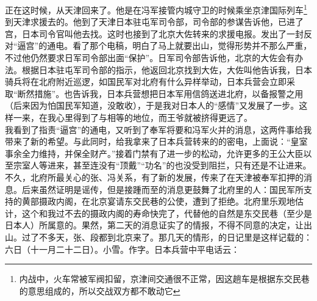 正在这时候，从天津回来了。他是在冯军接管内城守卫的时候乘坐京津国际列车\footnote{内战中，火车常被军阀扣留，京津间交通很不正常，因这趟车是根据东交民巷的意思组成的，所以交战双方都不敢动它}到天津求援去的。他到了天津日本驻屯军司令部，司令部的参谋告诉他，已进了宫，日本司令官叫他去找。这时也接到了北京大佐转来的求援电报。发出了一封反对“逼宫”的通电。看了那个电稿，明白了马上就要出山，觉得形势并不那么严重，不过他仍然要求日军司令部出面“保护”。日军司令部告诉他，北京的大佐会有办法。根据日本驻屯军司令部的指示，他返回北京找到大佐，大佐叫他告诉我，日本骑兵将在北府附近巡逻，如国民军对北府有什么异样举动，日本兵营会立即采取“断然措施”。也告诉我，日本兵营想把日本军用信鸽送进北府，以备报警之用（后来因为怕国民军知道，没敢收），于是我对日本人的“感情”又发展了一步。这样一来，在我心里得到了与相等的地位，而王爷就被挤得更远了。\\

我看到了指责“逼宫”的通电，又听到了奉军将要和冯军火并的消息，这两件事给我带来了新的希望。与此同时，给我拿来了日本兵营转来的的密电，上面说：“皇室事余全力维持，并保全财产。”接着门禁有了进一步的松动，允许更多的王公大臣以至宗室人等进来，甚至连没有“顶戴”“功名”的也没受到阻拦，只有还是不让进来。\\

不久，北府所最关心的张、冯关系，有了新的发展，传来了在天津被奉军扣押的消息。后来虽然证明是谣传，但是接踵而至的消息更鼓舞了北府里的人：国民军所支持的黄部摄政内阁，在北京宴请东交民巷的公使，遭到了拒绝。北府里乐观地估计，这个和我过不去的摄政内阁的寿命快完了，代替他的自然是东交民巷（至少是日本人）所属意的。果然，第二天的消息证实了的情报，不得不同意的决定，让出山。过了不多天，张、段都到北京来了。那几天的情形，的日记里是这样记载的：\\

六日（十一月二十二日）。小雪。作字。日本兵营中平电话云：\\

